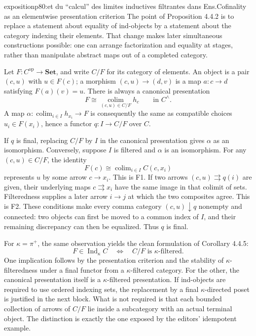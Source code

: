 \begin{dcomment}{exposition}{p80:et du “calcul” des limites inductives filtrantes dans Ens.}{Cofinality as an elementwise presentation criterion}
The point of Proposition 4.4.2 is to replace a statement about equality of ind-objects by a statement about the category indexing their elements.  That change makes later simultaneous constructions possible: one can arrange factorization and equality at stages, rather than manipulate abstract maps out of a completed category.

Let $F:C^{\mathrm{op}}\to\mathbf{Set}$, and write $C/F$ for its category of elements.  An object is a pair $(c,u)$ with $u\in F(c)$; a morphism $(c,u)\to(d,v)$ is a map $a:c\to d$ satisfying $F(a)(v)=u$.  There is always a canonical presentation
\[
 F\cong\operatorname*{colim}_{(c,u)\in C/F}h_c
 \qquad\text{in }C^\wedge.
\]
A map $\alpha:\operatorname{colim}_{i\in I}h_{x_i}\to F$ is consequently the same as compatible choices $u_i\in F(x_i)$, hence a functor $q:I\to C/F$ over $C$.

If $q$ is final, replacing $C/F$ by $I$ in the canonical presentation gives $\alpha$ as an isomorphism.  Conversely, suppose $I$ is filtered and $\alpha$ is an isomorphism.  For any $(c,u)\in C/F$, the identity
\[
 F(c)\cong\operatorname{colim}_{i\in I}C(c,x_i)
\]
represents $u$ by some arrow $c\to x_i$.  This is F1.  If two arrows $(c,u)\rightrightarrows q(i)$ are given, their underlying maps $c\rightrightarrows x_i$ have the same image in that colimit of sets.  Filteredness supplies a later arrow $i\to j$ at which the two composites agree.  This is F2.  These conditions make every comma category $(c,u)\downarrow q$ nonempty and connected: two objects can first be moved to a common index of $I$, and their remaining discrepancy can then be equalized.  Thus $q$ is final.

For $\kappa=\pi^+$, the same observation yields the clean formulation of Corollary 4.4.5:
\[
 F\in\operatorname{Ind}_\kappa C
 \quad\Longleftrightarrow\quad C/F\text{ is $\kappa$-filtered}.
\]
One implication follows by the presentation criterion and the stability of $\kappa$-filteredness under a final functor from a $\kappa$-filtered category.  For the other, the canonical presentation itself is a $\kappa$-filtered presentation.  If ind-objects are required to use ordered indexing sets, the replacement by a final $\kappa$-directed poset is justified in the next block.  What is not required is that each bounded collection of arrows of $C/F$ lie inside a subcategory with an actual terminal object.  The distinction is exactly the one exposed by the editors' idempotent example.
\end{dcomment}

